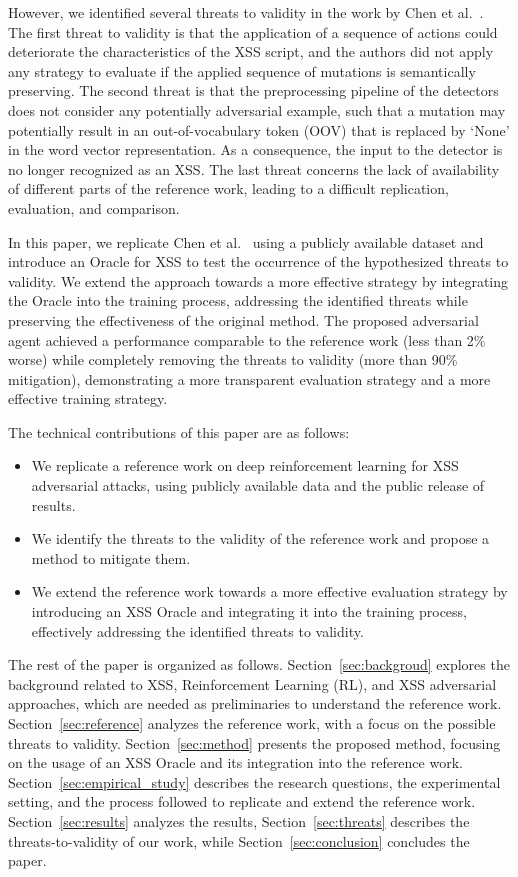 However, we identified several threats to validity in the work by Chen et al.~\cite{CHEN2022102831}. The first threat to validity is that the application of a sequence of actions could deteriorate the characteristics of the XSS script, and the authors did not apply any strategy to evaluate if the applied sequence of mutations is semantically preserving. The second threat is that the preprocessing pipeline of the detectors does not consider any potentially adversarial example, such that a mutation may potentially result in an out-of-vocabulary token (OOV) that is replaced by `None' in the word vector representation. As a consequence, the input  to the detector is  no longer recognized as an XSS. The last threat concerns the lack of availability of different parts of the reference work, leading to a difficult replication, evaluation, and comparison.

In this paper, we replicate Chen et al.~\cite{CHEN2022102831} using a publicly available dataset and introduce an Oracle for XSS to test the occurrence of the hypothesized threats to validity. We extend the approach towards a more effective strategy by integrating the Oracle into the training process, addressing the identified threats while preserving the effectiveness of the original method. The proposed adversarial agent achieved a performance comparable to the reference work (less than 2\% worse) while completely removing the threats to validity (more than 90\% mitigation), demonstrating a more transparent evaluation strategy and a more effective training strategy. 

The technical contributions of this paper are as follows: 
\begin{itemize}
   \item We replicate a reference work on deep reinforcement learning for XSS adversarial attacks, using publicly available data and the public release of results.
   
   \item We identify the threats to the validity of the reference work and propose a method to mitigate them.
   
   \item We extend the reference work towards a more effective evaluation strategy by introducing an XSS Oracle and integrating it into the training process, effectively addressing the identified threats to validity.
\end{itemize}


The rest of the paper is organized as follows. Section~\ref{sec:backgroud} explores the background related to XSS, Reinforcement Learning (RL), and XSS adversarial approaches, which are needed as preliminaries to understand the reference work.
Section~\ref{sec:reference} analyzes the reference work, with a focus on the possible threats to validity.
Section~\ref{sec:method} presents the proposed method, focusing on the usage of an XSS Oracle and its integration into the reference work.
Section~\ref{sec:empirical_study} describes the research questions, the experimental setting, and the process followed to replicate and extend the reference work.
Section~\ref{sec:results} analyzes the results, Section~\ref{sec:threats} describes the threats-to-validity of our work, while Section~\ref{sec:conclusion} concludes the paper.
